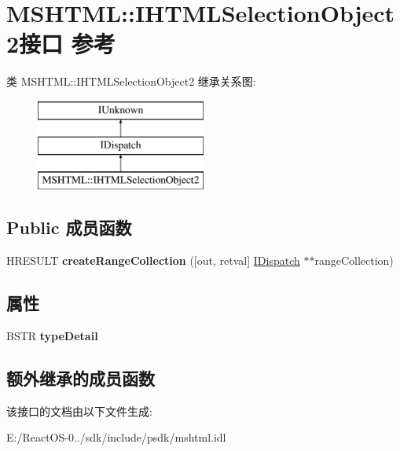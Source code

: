 \hypertarget{interface_m_s_h_t_m_l_1_1_i_h_t_m_l_selection_object2}{}\section{M\+S\+H\+T\+ML\+:\+:I\+H\+T\+M\+L\+Selection\+Object2接口 参考}
\label{interface_m_s_h_t_m_l_1_1_i_h_t_m_l_selection_object2}
类 M\+S\+H\+T\+ML\+:\+:I\+H\+T\+M\+L\+Selection\+Object2 继承关系图\+:\begin{figure}[H]
\begin{center}
\leavevmode
\includegraphics[height=3.000000cm]{interface_m_s_h_t_m_l_1_1_i_h_t_m_l_selection_object2}
\end{center}
\end{figure}
\subsection*{Public 成员函数}
\begin{DoxyCompactItemize}
\item 
\mbox{\label{interface_m_s_h_t_m_l_1_1_i_h_t_m_l_selection_object2_ad21948e60a83b1688eda80f4e5c3dd39}} 
H\+R\+E\+S\+U\+LT {\bfseries create\+Range\+Collection} (\mbox{[}out, retval\mbox{]} \hyperlink{interface_i_dispatch}{I\+Dispatch} $\ast$$\ast$range\+Collection)
\end{DoxyCompactItemize}
\subsection*{属性}
\begin{DoxyCompactItemize}
\item 
\mbox{\label{interface_m_s_h_t_m_l_1_1_i_h_t_m_l_selection_object2_a4078a53dd11d62c6190e4d2e43e800a5}} 
B\+S\+TR {\bfseries type\+Detail}
\end{DoxyCompactItemize}
\subsection*{额外继承的成员函数}


该接口的文档由以下文件生成\+:\begin{DoxyCompactItemize}
\item 
E\+:/\+React\+O\+S-\/0../sdk/include/psdk/mshtml.\+idl\end{DoxyCompactItemize}
